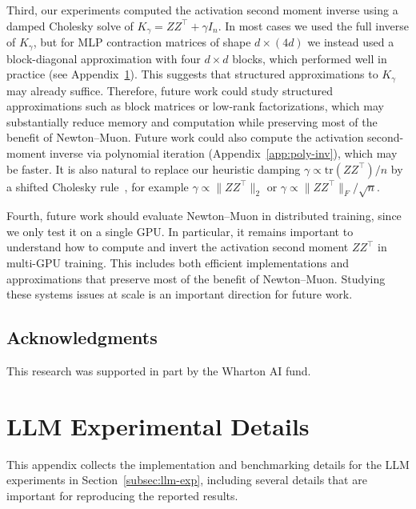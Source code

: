 \documentclass[11pt]{article}
\begin{document}
Third, our experiments computed the activation second moment inverse using a damped Cholesky solve of ${K}_\gamma = {Z}{Z}^\top + \gamma I_n$. In most cases we used the full inverse of ${K}_\gamma$, but for MLP contraction matrices of shape $d \times (4d)$ we instead used a block-diagonal approximation with four $d \times d$ blocks, which performed well in practice (see Appendix~\ref{app:llm-details}). This suggests that structured approximations to ${K}_\gamma$ may already suffice. Therefore, future work could study structured approximations such as block matrices or low-rank factorizations, which may substantially reduce memory and computation while preserving most of the benefit of Newton--Muon. Future work could also compute the activation second-moment inverse via polynomial iteration (Appendix~\ref{app:poly-inv}), which may be faster. It is also natural to replace our heuristic damping $\gamma \propto \mathrm{tr}(ZZ^\top)/n$ by a shifted Cholesky rule~\citep{fukaya2020shifted}, for example $\gamma \propto \|ZZ^\top\|_2$ or $\gamma \propto \|ZZ^\top\|_F/\sqrt{n}$. 

Fourth, future work should evaluate Newton--Muon in distributed training, since we only test it on a single GPU. In particular, it remains important to understand how to compute and invert the activation second moment ${Z}{Z}^\top$ in multi-GPU training. This includes both efficient implementations and approximations that preserve most of the benefit of Newton--Muon. Studying these systems issues at scale is an important direction for future work.


\subsection*{Acknowledgments}
This research was supported in part by the Wharton AI fund.





\clearpage
\appendix 
\appendixpage
\addappheadtotoc 

\section{LLM Experimental Details}
\label{app:llm-details}
This appendix collects the implementation and benchmarking details for the LLM experiments in Section~\ref{subsec:llm-exp}, including several details that are important for reproducing the reported results.
\end{document}

